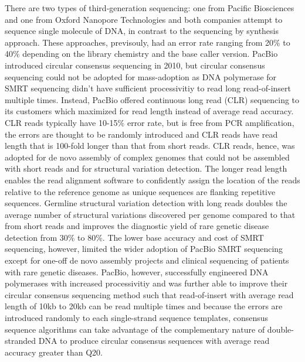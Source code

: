 There are two types of third-generation sequencing: one from Pacific Biosciences and one from Oxford Nanopore Technologies and both companies attempt to sequence single molecule of DNA, in contrast to the sequencing by synthesis approach. These approaches, previsouly, had an error rate ranging from 20\% to 40\% depending on the library chemistry and the base caller version. PacBio introduced circular consensus sequencing in 2010, but circular consensus sequencing could not be adopted for mass-adoption as DNA polymerase for SMRT sequencing didn't have sufficient processivitiy to read long read-of-insert multiple times. Instead, PacBio offered continuous long read (CLR) sequencing to its customers which maximized for read length instead of average read accuracy. CLR reads typically have 10-15\% error rate, but is free from PCR amplification, the errors are thought to be randomly introduced and CLR reads have read length that is 100-fold longer than that from short reads. CLR reads, hence, was adopted for de novo assembly of complex genomes that could not be assembled with short reads and for structural variation detection. The longer read length enables the read alignment software to confidently assign the location of the reads relative to the reference genome as unique sequences are flanking repetitive sequences. Germline structural variation detection with long reads doubles the average number of structural variations discovered per genome compared to that from short reads and improves the diagnostic yield of rare genetic disease detection from 30\% to 80\%. The lower base accuracy and cost of SMRT sequencing, however, limited the wider adoption of PacBio SMRT sequencing except for one-off de novo assembly projects and clinical sequencing of patients with rare genetic diseases. PacBio, however, successfully engineered DNA polymerases with increased processivitiy and was further able to improve their circular consensus sequencing method such that read-of-insert with average read length of 10kb to 20kb can be read multiple times and because the errors are introduced randomly to each single-strand sequence templates, consensus sequence algorithms can take advantage of the complementary nature of double-stranded DNA to produce circular consensus sequences with average read accuracy greater than Q20.  


